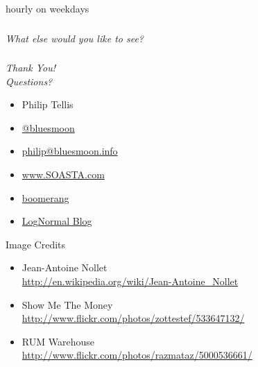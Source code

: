 \documentclass{beamer}
\newcommand{\innersplash}[1]{
  \begin{center}
    \Large \textrm{\textit{ #1 } }
  \end{center}
}
\newcommand{\splashslide}[2][{}]{
  \begin{frame}
  \frametitle{#1}
  \innersplash{#2}
  \end{frame}
}
\begin{document}
\begin{frame}{hourly on weekdays}
\end{frame}


\splashslide{What else would you like to see?}

\splashslide{Thank You! \\ Questions?}

\begin{frame}
  \begin{itemize}
  \item Philip Tellis
  \item \href{http://twitter.com/bluesmoon}{@bluesmoon}
  \item \href{http://bluesmoon.info/}{philip@bluesmoon.info}
  \item \href{http://www.soasta.com/}{www.SOASTA.com}
  \item \href{http://lognormal.github.com/boomerang/doc/}{boomerang}
  \item \href{http://www.lognormal.com/blog/}{LogNormal Blog}
  \end{itemize}
\end{frame}

\begin{frame}{Image Credits}
\begin{itemize}
  \item Jean-Antoine Nollet \\ \small \href{http://en.wikipedia.org/wiki/Jean-Antoine_Nollet}{http://en.wikipedia.org/wiki/Jean-Antoine\_Nollet}
  \item Show Me The Money \\ \small \href{http://www.flickr.com/photos/zottestef/533647132/}{http://www.flickr.com/photos/zottestef/533647132/}
  \item RUM Warehouse \\ \small \href{http://www.flickr.com/photos/razmataz/5000536661/}{http://www.flickr.com/photos/razmataz/5000536661/}
\end{itemize}
\end{frame}
\end{document}
